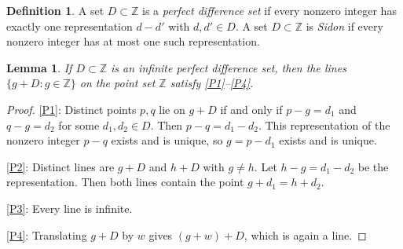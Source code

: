 \documentclass[11pt]{article}
\newtheorem{lemma}[theorem]{Lemma}
\theoremstyle{definition}
\newtheorem{definition}[theorem]{Definition}
\theoremstyle{remark}
\newcommand{\Z}{\mathbb{Z}}
\begin{document}
\begin{definition}
A set $D\subset\Z$ is a \emph{perfect difference set} if every nonzero integer has exactly one representation $d-d'$ with $d,d'\in D$. A set $D\subset\Z$ is \emph{Sidon} if every nonzero integer has at most one such representation.
\end{definition}

\begin{lemma}\label{lem:plane}
If $D\subset\Z$ is an infinite perfect difference set, then the lines $\{g+D:g\in\Z\}$ on the point set $\Z$ satisfy \ref{P1}--\ref{P4}.
\end{lemma}

\begin{proof}
\ref{P1}: Distinct points $p,q$ lie on $g+D$ if and only if $p-g=d_1$ and $q-g=d_2$ for some $d_1,d_2\in D$. Then $p-q=d_1-d_2$. This representation of the nonzero integer $p-q$ exists and is unique, so $g=p-d_1$ exists and is unique.

\ref{P2}: Distinct lines are $g+D$ and $h+D$ with $g\neq h$. Let $h-g=d_1-d_2$ be the representation. Then both lines contain the point $g+d_1=h+d_2$.

\ref{P3}: Every line is infinite.

\ref{P4}: Translating $g+D$ by $w$ gives $(g+w)+D$, which is again a line.
\end{proof}
\end{document}
